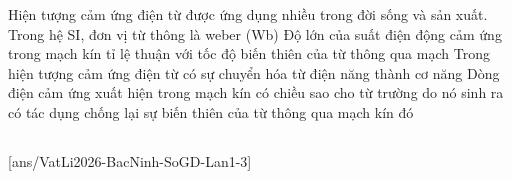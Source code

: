 	\begin{ex}%
		Hiện tượng cảm ứng điện từ được ứng dụng nhiều trong đời sống và sản xuất.
		\choiceTFt
		{\True Trong hệ SI, đơn vị từ thông là weber (Wb)}
		{\True Độ lớn của suất điện động cảm ứng trong mạch kín tỉ lệ thuận với tốc độ biến thiên của từ thông qua mạch}
		{Trong hiện tượng cảm ứng điện từ có sự chuyển hóa từ điện năng thành cơ năng}
		{\True Dòng điện cảm ứng xuất hiện trong mạch kín có chiều sao cho từ trường do nó sinh ra có tác dụng chống lại sự biến thiên của từ thông qua mạch kín đó}
	\end{ex}

	\subsection*{}
	\setcounter{ex}{0}
	[ans/VatLi2026-BacNinh-SoGD-Lan1-3]

